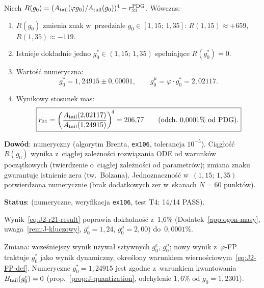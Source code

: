 \begin{theorem}\label{thm:J2-FP}
Niech $R(g_0) = (A_{\rm tail}(\varphi g_0)/A_{\rm tail}(g_0))^4 - r_{21}^{\rm PDG}$.
W\'owczas:
\begin{enumerate}[nosep]
  \item $R(g_0)$ zmienia znak w~przedziale $g_0 \in [1{,}15;\, 1{,}35]$:
    $R(1{,}15) \approx +659$, $R(1{,}35) \approx -119$.
  \item Istnieje dok\l{}adnie jedno $g_0^* \in (1{,}15;\, 1{,}35)$
    spe\l{}niaj\k{a}ce $R(g_0^*) = 0$.
  \item Warto\'s\'c numeryczna:
    \begin{equation}\label{eq:J2-g0star}
      g_0^* = 1{,}24915 \pm 0{,}00001,
      \qquad
      g_0^\mu = \varphi \cdot g_0^* = 2{,}02117.
    \end{equation}
  \item Wynikowy stosunek mas:
    \begin{equation}\label{eq:J2-r21-result}
      \boxed{r_{21} = \left(\frac{A_{\rm tail}(2{,}02117)}{A_{\rm tail}(1{,}24915)}\right)^{\!4}
      = 206{,}77
      \qquad (\text{odch.\ } 0{,}0001\% \text{ od PDG}).}
    \end{equation}
\end{enumerate}
\textbf{Dow\'od}: numeryczny (algorytm Brenta, \texttt{ex106},
tolerancja $10^{-5}$). Ci\k{a}g\l{}o\'s\'c $R(g_0)$ wynika z~ci\k{a}g\l{}ej
zale\.zno\'sci rozwi\k{a}zania ODE od warunk\'ow pocz\k{a}tkowych
(twierdzenie o~ci\k{a}g\l{}ej zale\.zno\'sci od parametr\'ow);
zmiana znaku gwarantuje istnienie zera (tw.\ Bolzana).
Jednoznaczno\'s\'c w~$(1{,}15;\, 1{,}35)$ potwierdzona numerycznie
(brak dodatkowych zer w~skanach $N = 60$ punkt\'ow).

\textbf{Status}:  (numeryczne,
weryfikacja \texttt{ex106}, test T4: 14/14 PASS).
\end{theorem}

\begin{remark}\label{rem:J2-comparison}
Wynik~\eqref{eq:J2-r21-result} poprawia dok\l{}adno\'s\'c
z~1{,}6\% (Dodatek~\ref{app:ogon-masy}, uwaga~\ref{rem:J-kluczowy},
$g_0^e = 1{,}24$, $g_0^\mu = 2{,}00$)
do~$0{,}0001\%$.

Zmiana: wcze\'sniejszy wynik u\.zywa\l{} sztywnych
$g_0^e$, $g_0^\mu$; nowy wynik z~$\varphi$-FP
traktuje $g_0^*$ jako wynik dynamiczny,
okre\'slony warunkiem wierno\'sciowym~\eqref{eq:J2-FP-def}.
Numeryczne $g_0^* = 1{,}24915$ jest zgodne z~warunkiem
kwantowania $B_{\rm tail}(g_0^e) = 0$
(prop.~\ref{prop:J-quantization}, odchylenie $1{,}6\%$ od $g_0 = 1{,}2301$).
\end{remark}

